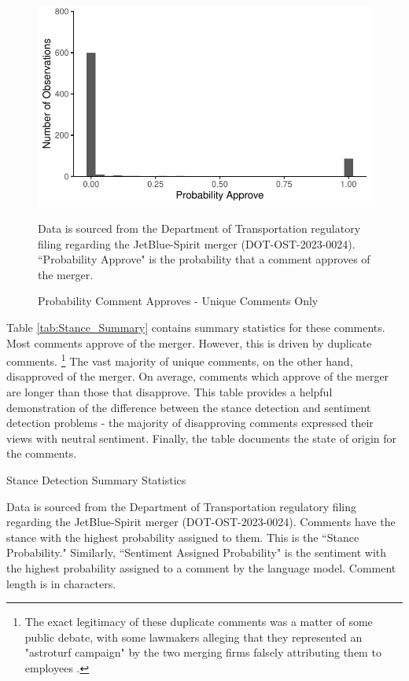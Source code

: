 \documentclass{article}
\begin{document}
\begin{appendices}
	\begin{figure}
		\caption{Probability Comment Approves - Unique Comments Only}
		\label{fig:ProbabilityApprove_Unique}
        \begin{center}
            \includegraphics{05.Figures/stance_strength_unique.pdf}
        \end{center}
				\begin{minipage}{\textwidth} 
			{\footnotesize Data is sourced from the Department of Transportation regulatory filing regarding the JetBlue-Spirit merger (DOT-OST-2023-0024). ``Probability Approve" is the probability that a comment approves of the merger.} 
		\end{minipage}
	\end{figure}


Table \ref{tab:Stance_Summary} contains summary statistics for these comments. Most comments approve of the merger. However, this is driven by duplicate comments. \footnote{The exact legitimacy of these duplicate comments was a matter of some public debate, with some lawmakers alleging that they represented an "astroturf campaign" by the two merging firms falsely attributing them to employees \citep{birnbaum_elizabeth_2023}.}  The vast majority of unique comments, on the other hand, disapproved of the merger. On average, comments which approve of the merger are longer than those that disapprove. This table provides a helpful demonstration of the difference between the stance detection and sentiment detection problems -  the majority of disapproving comments expressed their views with neutral sentiment. Finally, the table documents the state of origin for the comments. 

\begin{table}[h]
    \caption{Stance Detection Summary Statistics}
    \label{tab:Stance_Summary}
    
    \begin{minipage}{\textwidth} 
        {\footnotesize Data is sourced from the Department of Transportation regulatory filing regarding the JetBlue-Spirit merger  (DOT-OST-2023-0024). Comments have the stance with the highest probability assigned to them. This is the ``Stance Probability." Similarly, ``Sentiment Assigned Probability" is the sentiment with the highest  probability assigned to a comment by the language model. Comment length is in characters.} 
    \end{minipage}
\end{table}


\end{appendices}
\end{document}
